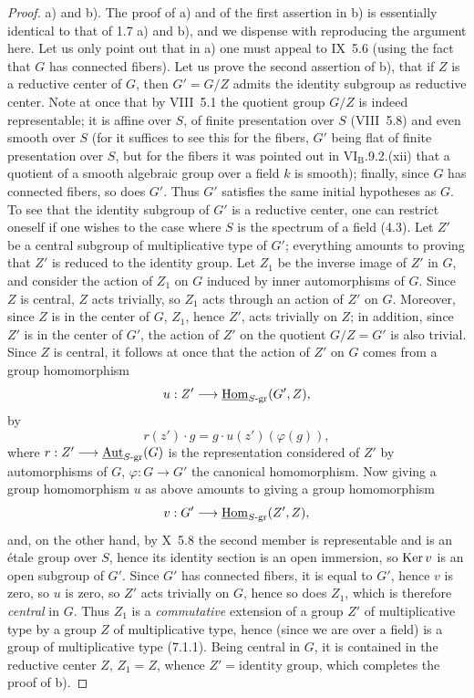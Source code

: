 \begin{proof}
a) and b). The proof of a) and of the first assertion in b) is essentially identical to that of 1.7 a) and b), and we dispense with reproducing the argument here. Let us only point out that in a) one must appeal to IX~5.6 (using the fact that $G$ has connected fibers). Let us prove the second assertion of b), \ie that if $Z$ is a reductive center of $G$, then $G'=G/Z$ admits the identity subgroup as reductive center. Note at once that by VIII~5.1 the quotient group $G/Z$ is indeed representable; it is affine over $S$, of finite presentation over $S$ (VIII~5.8) and even smooth over $S$ (for it suffices to see this for the fibers, $G'$ being flat of finite presentation over $S$, but for the fibers it was pointed out in VI$_{\mathrm B}$.9.2.(xii) that a quotient of a smooth algebraic group over a field $k$ is smooth); finally, since $G$ has connected fibers, so does $G'$. Thus $G'$ satisfies the same initial hypotheses as $G$. To see that the identity subgroup of $G'$ is a reductive center, one can restrict oneself if one wishes to the case where $S$ is the spectrum of a field (4.3). Let $Z'$ be a central subgroup of multiplicative type of $G'$; everything amounts to proving that $Z'$ is reduced to the identity group. Let $Z_1$ be the inverse image of $Z'$ in $G$, and consider the action of $Z_1$ on $G$ induced by inner automorphisms of $G$. Since $Z$ is central, $Z$ acts trivially, so $Z_1$ acts through an action of $Z'$ on $G$. Moreover, since $Z$ is in the center of $G$, $Z_1$, hence $Z'$, acts trivially on $Z$; in addition, since $Z'$ is in the center of $G'$, the action of $Z'$ on the quotient $G/Z=G'$ is also trivial. Since $Z$ is central, it follows at once that the action of $Z'$ on $G$ comes from a group homomorphism
\[
u:Z'\longrightarrow\underline{\operatorname{Hom}}_{S\text{-gr}}(G',Z),
\]
by
\[
r(z')\cdot g=g\cdot u(z')(\varphi(g)),
\]
where $r:Z'\longrightarrow\underline{\operatorname{Aut}}_{S\text{-gr}}(G)$ is the representation considered of $Z'$ by automorphisms of $G$, $\varphi:G\to G'$ the canonical homomorphism. Now giving a group homomorphism $u$ as above amounts to giving a group homomorphism
\[
v:G'\longrightarrow\underline{\operatorname{Hom}}_{S\text{-gr}}(Z',Z),
\]
and, on the other hand, by X~5.8 the second member is representable and is an étale group over $S$, hence its identity section is an open immersion, so $\operatorname{Ker} v$ is an open subgroup of $G'$. Since $G'$ has connected fibers, it is equal to $G'$, hence $v$ is zero, so $u$ is zero, so $Z'$ acts trivially on $G$, hence so does $Z_1$, which is therefore \emph{central} in $G$. Thus $Z_1$ is a \emph{commutative} extension of a group $Z'$ of multiplicative type by a group $Z$ of multiplicative type, hence (since we are over a field) is a group of multiplicative type (7.1.1). Being central in $G$, it is contained in the reductive center $Z$, \ie $Z_1=Z$, whence $Z'=\text{identity group}$, which completes the proof of b).


\end{proof}
